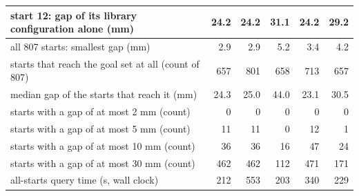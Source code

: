 \begin{tabular}{@{}>{\raggedright\arraybackslash}p{6.2cm} rrrrr@{}}
start 12: gap of its library configuration alone (mm) & 24.2 & 24.2 & 31.1 & 24.2 & 29.2 \\
\midrule
all 807 starts: smallest gap (mm) & 2.9 & 2.9 & 5.2 & 3.4 & 4.2 \\
starts that reach the goal set at all (count of 807) & 657 & 801 & 658 & 713 & 657 \\
median gap of the starts that reach it (mm) & 24.3 & 25.0 & 44.0 & 23.1 & 30.5 \\
starts with a gap of at most 2 mm (count) & 0 & 0 & 0 & 0 & 0 \\
starts with a gap of at most 5 mm (count) & 11 & 11 & 0 & 12 & 1 \\
starts with a gap of at most 10 mm (count) & 36 & 36 & 16 & 47 & 24 \\
starts with a gap of at most 30 mm (count) & 462 & 462 & 112 & 471 & 171 \\
all-starts query time (s, wall clock) & 212 & 553 & 203 & 340 & 229 \\
\bottomrule
\end{tabular}

